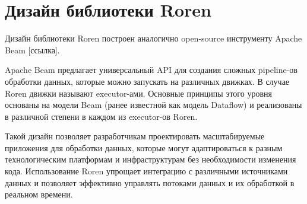 \section{Дизайн библиотеки Roren}
\label{sec:design}

Дизайн библиотеки Roren построен аналогично open-source инструменту Apache Beam [ссылка].

Apache Beam предлагает универсальный API для создания сложных pipeline-ов обработки данных, которые можно запускать на различных движках. В случае Roren движки называют executor-ами. Основные принципы этого уровня основаны на модели Beam (ранее известной как модель Dataflow) и реализованы в различной степени в каждом из executor-ов Roren.

Такой дизайн позволяет разработчикам проектировать масштабируемые приложения для обработки данных, которые могут адаптироваться к разным технологическим платформам и инфраструктурам без необходимости изменения кода. Использование Roren упрощает интеграцию с различными источниками данных и позволяет эффективно управлять потоками данных и их обработкой в реальном времени.

\newpage

\newpage

\newpage

